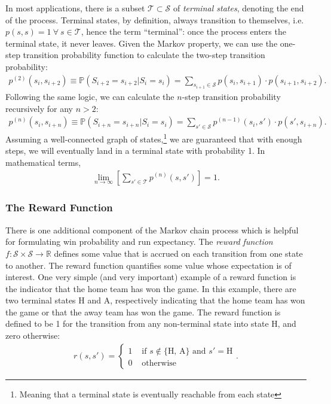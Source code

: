 \documentclass{article}
\begin{document}
    In most applications, there is a subset $\mathcal T \subset \mathcal S$ of {\it terminal states}, denoting the end of the process. Terminal states, by definition, always transition to themselves, i.e. $p(s, s) = 1 ~\forall~s\in \mathcal T$, hence the term ``terminal'': once the process enters the terminal state, it never leaves. Given the Markov property, we can use the one-step transition probability function to calculate the two-step transition probability:
    \begin{align*}
      p^{(2)}(s_i, s_{i+2}) \equiv \mathbb{P}(S_{i+2} = s_{i+2} | S_i = s_i) = \sum_{s_{i+1} \in \mathcal S} p(s_i, s_{i+1}) \cdot p(s_{i+1}, s_{i+2}).
    \end{align*}
    Following the same logic, we can calculate the $n$-step transition probability recursively for any $n > 2$:
    \begin{align*}
      p^{(n)}(s_i, s_{i+n}) \equiv \mathbb{P}(S_{i+n} = s_{i+n} | S_i = s_i) = \sum_{s' \in \mathcal S} p^{(n-1)}(s_i, s') \cdot p(s', s_{i+n}).
    \end{align*}
    Assuming a well-connected graph of states,\footnote{Meaning that a terminal state is eventually reachable from each state} we are guaranteed that with enough steps, we will eventually land in a terminal state with probability 1. In mathematical terms,
    \begin{align*}
      \lim_{n\rightarrow\infty} \left[\sum_{s' \in \mathcal T} p^{(n)}(s, s')\right] = 1.
    \end{align*}

    \subsubsection{\sc The Reward Function}

      There is one additional component of the Markov chain process which is helpful for formulating win probability and run expectancy. The {\it reward function} $f : \mathcal S \times \mathcal S \rightarrow \mathbb{R}$ defines some value that is accrued on each transition from one state to another. The reward function quantifies some value whose expectation is of interest. One very simple (and very important) example of a reward function is the indicator that the home team has won the game. In this example, there are two terminal states H and A, respectively indicating that the home team has won the game or that the away team has won the game. The reward function is defined to be 1 for the transition from any non-terminal state into state H, and zero otherwise:
      \begin{align}
        \label{eqn:reward-home-win}
        r(s, s') = \begin{cases}
          1 & \mbox{ if } s \notin \{\mbox{H, A}\} \mbox{ and } s' = \mbox{H}\\
          0 & \mbox{ otherwise}
        \end{cases}.
      \end{align}
\end{document}
